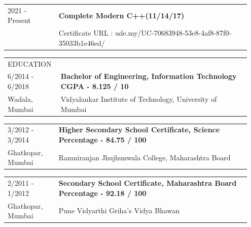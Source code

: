 \documentclass{letter}
\begin{document}
\begin{tabular}{p{0.2\linewidth} p{0.75\linewidth}}
  2021 - Present & \normalsize\textbf{Complete Modern C++(11/14/17)} \\
  & Certificate URL : \ttfamily ude.my/UC-70683948-53e8-4af8-87f0-35033b1e46ed/ \\
\end{tabular}


\vspace{15pt}
\begin{tabular}{p{0.2\linewidth} p{0.75\linewidth}}
  \normalsize\colorbox{black!100}{\textcolor{white!90}{EDUCATION}} \\[1ex] 
  6/2014 - 6/2018 & \normalsize\textbf{Bachelor of Engineering, Information Technology} \hfill \footnotesize\textbf{CGPA - 8.125 / 10} \\
  \small Wadala, Mumbai & Vidyalankar Institute of Technology, University of Mumbai \\
\end{tabular}

\begin{tabular}{p{0.2\linewidth} p{0.75\linewidth}}
  3/2012 - 3/2014 & \normalsize\textbf{Higher Secondary School Certificate, Science} \hfill \footnotesize\textbf{Percentage - 84.75 / 100} \\
  \small Ghatkopar, Mumbai & Ramniranjan Jhujhunwala College, Maharashtra Board \\
\end{tabular}

\begin{tabular}{p{0.2\linewidth} p{0.75\linewidth}}
  2/2011 - 1/2012 & \normalsize\textbf{Secondary School Certificate, Maharashtra Board} \hfill \footnotesize\textbf{Percentage - 92.18 / 100} \\
  \small Ghatkopar, Mumbai & Pune Vidyarthi Griha's Vidya Bhawan \\
\end{tabular}
\end{document}
